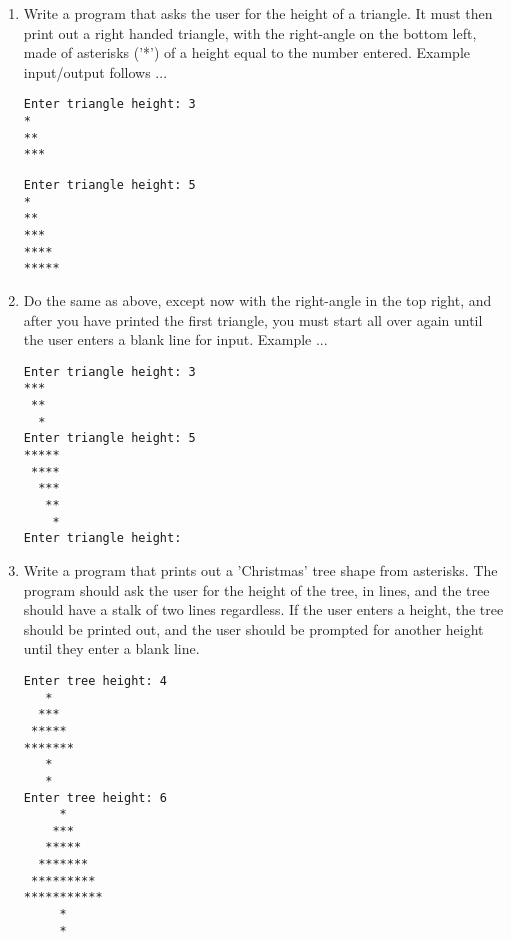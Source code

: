\begin{enumerate}
	\item Write a program that asks the user for the height of a triangle.    It must then print out a right handed triangle, with the right-angle on the    bottom left, made of asterisks ('*') of a height equal to the    number entered. Example input/output follows ...      
\begin{lstlisting}
Enter triangle height: 3
*
**
***
\end{lstlisting}
\begin{lstlisting}
Enter triangle height: 5
*
**
***
****
*****
\end{lstlisting}
	\item Do the same as above, except now with the right-angle in the top right, and after you have printed the first triangle, you must start all over again until the user enters a blank line for input. Example ...      
\begin{lstlisting}
Enter triangle height: 3
***
 **
  *
Enter triangle height: 5
*****
 ****
  ***
   **
    *
Enter triangle height: 
\end{lstlisting}
	\item Write a program that prints out a 'Christmas' tree shape from    asterisks. The program should ask the user for the height of the    tree, in lines, and the tree should have a stalk of two lines    regardless. If the user enters a height, the tree should be printed    out, and the user should be prompted for another height until they    enter a blank line.     
\begin{lstlisting}
Enter tree height: 4
   *
  ***
 *****
*******
   *
   *
Enter tree height: 6
     *
    ***
   *****
  *******
 *********
***********
     *
     *
\end{lstlisting}
\end{enumerate}    